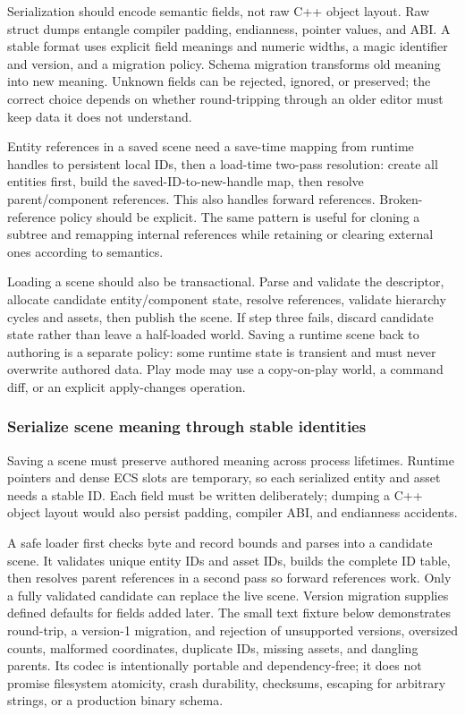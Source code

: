 Serialization should encode semantic fields, not raw C++ object layout. Raw struct dumps entangle compiler padding, endianness, pointer values, and ABI. A stable format uses explicit field meanings and numeric widths, a magic identifier and version, and a migration policy. Schema migration transforms old meaning into new meaning. Unknown fields can be rejected, ignored, or preserved; the correct choice depends on whether round-tripping through an older editor must keep data it does not understand.

Entity references in a saved scene need a save-time mapping from runtime handles to persistent local IDs, then a load-time two-pass resolution: create all entities first, build the saved-ID-to-new-handle map, then resolve parent/component references. This also handles forward references. Broken-reference policy should be explicit. The same pattern is useful for cloning a subtree and remapping internal references while retaining or clearing external ones according to semantics.

Loading a scene should also be transactional. Parse and validate the descriptor, allocate candidate entity/component state, resolve references, validate hierarchy cycles and assets, then publish the scene. If step three fails, discard candidate state rather than leave a half-loaded world. Saving a runtime scene back to authoring is a separate policy: some runtime state is transient and must never overwrite authored data. Play mode may use a copy-on-play world, a command diff, or an explicit apply-changes operation.

\subsubsection{Serialize scene meaning through stable identities}\label{05-engine-i-ch008-serialize-scene-meaning-through-stable-identities}

Saving a scene must preserve authored meaning across process lifetimes. Runtime pointers and dense ECS slots are temporary, so each serialized entity and asset needs a stable ID. Each field must be written deliberately; dumping a C++ object layout would also persist padding, compiler ABI, and endianness accidents.

A safe loader first checks byte and record bounds and parses into a candidate scene. It validates unique entity IDs and asset IDs, builds the complete ID table, then resolves parent references in a second pass so forward references work. Only a fully validated candidate can replace the live scene. Version migration supplies defined defaults for fields added later. The small text fixture below demonstrates round-trip, a version-1 migration, and rejection of unsupported versions, oversized counts, malformed coordinates, duplicate IDs, missing assets, and dangling parents. Its codec is intentionally portable and dependency-free; it does not promise filesystem atomicity, crash durability, checksums, escaping for arbitrary strings, or a production binary schema.

